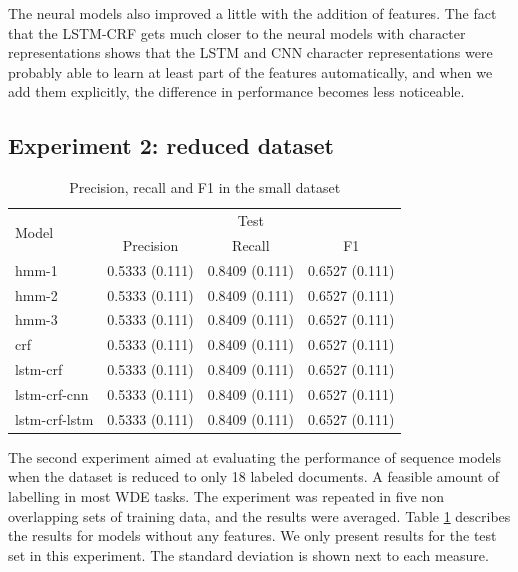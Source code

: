 \documentclass[sigconf]{acmart}
\begin{document}
The neural models also improved a little with the addition of features. The fact that 
the LSTM-CRF gets much closer to the neural models with character representations
shows that the LSTM and CNN character representations were probably able to learn 
at least part of the features automatically, and when we add them explicitly,
the difference in performance becomes less noticeable.

\subsection{Experiment 2: reduced dataset}

\begin{table}[h]
  \small
  \begin{center}
    \begin{tabular}{ |l|l|l|l|}
      \hline
      \multirow{2}{*}{Model} & \multicolumn{3}{c|}{Test} \\
                             & \multicolumn{1}{c}{Precision} & \multicolumn{1}{c}{Recall} & \multicolumn{1}{c|}{F1} \\
      \hline
      hmm-1           & 0.5333 (0.111) & 0.8409 (0.111) & 0.6527 (0.111) \\
      hmm-2           & 0.5333 (0.111) & 0.8409 (0.111) & 0.6527 (0.111) \\
      hmm-3           & 0.5333 (0.111) & 0.8409 (0.111) & 0.6527 (0.111) \\
      crf             & 0.5333 (0.111) & 0.8409 (0.111) & 0.6527 (0.111) \\
      lstm-crf        & 0.5333 (0.111) & 0.8409 (0.111) & 0.6527 (0.111) \\
      lstm-crf-cnn    & 0.5333 (0.111) & 0.8409 (0.111) & 0.6527 (0.111) \\
      lstm-crf-lstm   & 0.5333 (0.111) & 0.8409 (0.111) & 0.6527 (0.111) \\
      \hline
    \end{tabular}
  \end{center}
  \caption{Precision, recall and F1 in the small dataset}
  \label{tab:experiment2}
\end{table}

The second experiment aimed at evaluating the performance of sequence models
when the dataset is reduced to only 18 labeled documents. A feasible amount of 
labelling in most WDE tasks. The experiment was repeated in five non overlapping 
sets of training data, and the results were averaged. Table \ref{tab:experiment2} 
describes the results for models without any features. We only present results
for the test set in this experiment. The standard deviation is shown next to each
measure.
\end{document}
